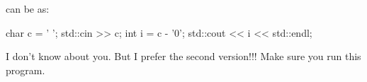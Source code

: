 can be  as:

\begin{consolethree}[escapeinside=||]
char c = ' ';
std::cin >> c;
int i = c - '0';
std::cout << i << std::endl;
\end{consolethree}

I don't know about you. But I prefer the second version!!! Make sure you run this program.




